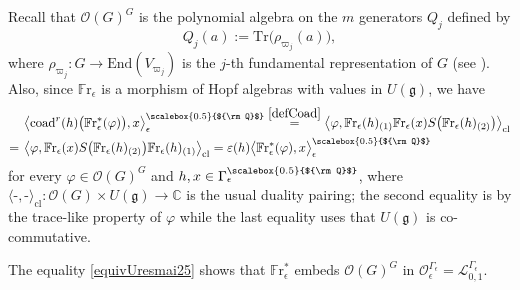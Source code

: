 \documentclass[11pt]{amsart}
\newcommand{\e}{\epsilon}
\newcommand{\Oo}{\mathcal{O}}
\newcommand{\Q}{{\scalebox{0.5}{${\rm Q}$}}}
\begin{document}
\indent Recall that $\mathcal{O}(G)^{G}$ is the polynomial algebra on the $m$ generators $Q_j$ defined by
\begin{equation}\label{carclassmai25}
Q_j(a) := \mathrm{Tr}\bigl(\rho_{\varpi_j}(a)\bigr),
\end{equation} where $\rho_{\varpi_j}\colon G \to \mathrm{End}(V_{\varpi_j})$ is the $j$-th fundamental representation of $G$ (see \cite[Th.\,6.1]{Steinberg}). Also, since $\mathbb{F}\mathrm{r}_\e$ is a morphism of Hopf algebras with values in $U(\mathfrak{g})$, we have
\begin{align}
\begin{split}\label{equivUresmai25}
&\bigl\langle \mathrm{coad}^r(h)\big(\mathbb{F}\mathrm{r}_\e^*(\varphi)\bigr), x \bigr\rangle^\Q_\e \overset{\eqref{defCoad}}{=} \bigl\langle \varphi, \mathbb{F}\mathrm{r}_\e(h)_{(1)}\mathbb{F}\mathrm{r}_\e(x) S\bigl( \mathbb{F}\mathrm{r}_\e(h)_{(2)} \bigr) \bigr\rangle_{\mathrm{cl}}\\
=\:\,&\bigl\langle \varphi, \mathbb{F}\mathrm{r}_\e(x) S\bigl( \mathbb{F}\mathrm{r}_\e(h)_{(2)} \bigr) \mathbb{F}\mathrm{r}_\e(h)_{(1)}\bigr\rangle_{\mathrm{cl}} = \varepsilon(h)\bigl\langle \mathbb{F}\mathrm{r}_\e^*(\varphi), x \bigr\rangle^\Q_\e
\end{split}
\end{align}
for every $\varphi\in \mathcal{O}(G)^{G}$ and $h,x\in \Gamma_\e^\Q$, where $\langle \text{-},\text{-} \rangle_{\mathrm{cl}} : \mathcal{O}(G) \times U(\mathfrak{g}) \to \mathbb{C}$ is the usual duality pairing; the second equality is by the trace-like property of $\varphi$ while the last equality uses that $U(\mathfrak{g})$ is co-commutative.

The equality \eqref{equivUresmai25} shows that $\mathbb{F}\mathrm{r}_\e^*$ embeds $\mathcal{O}(G)^{G}$ in $\Oo_\e^{\Gamma_\e} = \mathcal{L}_{0,1}^{\Gamma_\epsilon}$. 
\end{document}
